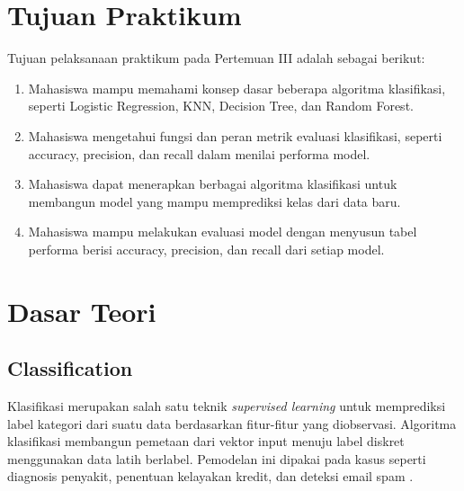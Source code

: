 \documentclass[a4paper,oneside,12pt]{report}
\begin{document}
\setcounter{page}{3}

\chapter[Tujuan Praktikum]{Tujuan Praktikum}
Tujuan pelaksanaan praktikum pada Pertemuan III adalah sebagai berikut:
\begin{enumerate}
    \item Mahasiswa mampu memahami konsep dasar beberapa algoritma klasifikasi, seperti Logistic Regression, KNN, Decision Tree, dan Random Forest.
    \item Mahasiswa mengetahui fungsi dan peran metrik evaluasi klasifikasi, seperti accuracy, precision, dan recall dalam menilai performa model.
    \item Mahasiswa dapat menerapkan berbagai algoritma klasifikasi untuk membangun model yang mampu memprediksi kelas dari data baru.
    \item Mahasiswa mampu melakukan evaluasi model dengan menyusun tabel performa berisi accuracy, precision, dan recall dari setiap model.
\end{enumerate}
\clearpage

\chapter{Dasar Teori}

\section{Classification}
Klasifikasi merupakan salah satu teknik \textit{supervised learning} untuk memprediksi label kategori dari suatu data berdasarkan fitur-fitur yang diobservasi. Algoritma klasifikasi membangun pemetaan dari vektor input menuju label diskret menggunakan data latih berlabel. Pemodelan ini dipakai pada kasus seperti diagnosis penyakit, penentuan kelayakan kredit, dan deteksi email spam \cite{ref1,ref4}.
\end{document}
